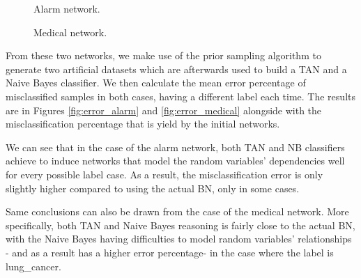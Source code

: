 \documentclass[11pt]{article}
\begin{document}
	\begin{figure}[H]
		\caption{Alarm network.}
		\label{fig:alarm}
	\end{figure}
	\begin{figure}[H]
		\caption{Medical network.}
		\label{fig:medical_net}
	\end{figure}
	From these two networks, we make use of the prior sampling algorithm to generate two artificial datasets which are afterwards used to build a TAN and a Naive Bayes classifier. We then calculate the mean error percentage of misclassified samples in both cases, having a different label each time. The results are in Figures \ref{fig:error_alarm} and \ref{fig:error_medical} alongside with the misclassification percentage that is yield by the initial networks.
	\par
	We can see that in the case of the alarm network, both TAN and NB classifiers achieve to induce networks that model the random variables' dependencies well for every possible label case. As a result, the misclassification error is only slightly higher compared to using the actual BN, only in some cases.
	\par
	Same conclusions can also be drawn from the case of the medical network. More specifically, both TAN and Naive Bayes reasoning is fairly close to the actual BN, with the Naive Bayes having difficulties to model random variables' relationships - and as a result has a higher error percentage-  in the case where the label is lung\_cancer.
\end{document}

